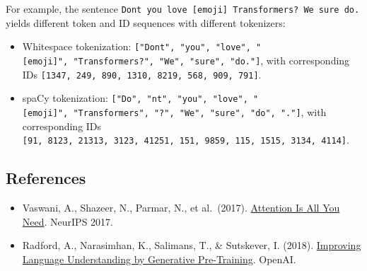 For example, the sentence \texttt{Don\textquotesingle{}t\ you\ love\ {[}emoji{]}\ Transformers?\ We\ sure\ do.} yields different token and ID sequences with different tokenizers:

\begin{itemize}
\tightlist
\item
  Whitespace tokenization: \texttt{{[}"Don\textquotesingle{}t",\ "you",\ "love",\ "{[}emoji{]}",\ "Transformers?",\ "We",\ "sure",\ "do."{]}}, with corresponding IDs \texttt{{[}1347,\ 249,\ 890,\ 1310,\ 8219,\ 568,\ 909,\ 791{]}}.
\item
  spaCy tokenization: \texttt{{[}"Do",\ "n\textquotesingle{}t",\ "you",\ "love",\ "{[}emoji{]}",\ "Transformers",\ "?",\ "We",\ "sure",\ "do",\ "."{]}}, with corresponding IDs \texttt{{[}91,\ 8123,\ 21313,\ 3123,\ 41251,\ 151,\ 9859,\ 115,\ 1515,\ 3134,\ 4114{]}}.
\end{itemize}

\FloatBarrier
{}
\hypertarget{references-74}{%
\subsection{References}\label{references-74}}

\vspace{0.25em}
\begin{itemize}
\tightlist
\item
  Vaswani, A., Shazeer, N., Parmar, N., et al.~(2017). \href{https://arxiv.org/abs/1706.03762}{Attention Is All You Need}. NeurIPS 2017.
\item
  Radford, A., Narasimhan, K., Salimans, T., \& Sutskever, I. (2018). \href{https://cdn.openai.com/research-covers/language-unsupervised/language_understanding_paper.pdf}{Improving Language Understanding by Generative Pre-Training}. OpenAI.
\end{itemize}

\clearpage
